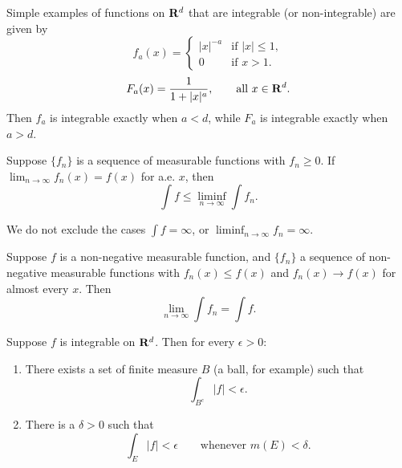 \begin{example}
    Simple examples of functions on $\mathbf{R}^d$ that are integrable
    (or non-integrable) are given by
    \begin{equation}
        f_a(x) =
        \begin{cases}
            |x|^{-a} & \text{if } |x| \le 1,\\
            0 & \text{if } x > 1.
        \end{cases}
    \end{equation}
    \begin{equation}
        F_a(x) = \frac{1}{1 + |x|^a}, \qquad \text{all } x \in \mathbf{R}^d.
    \end{equation}
    Then $f_a$ is integrable exactly when $a < d$, while $F_a$ is integrable
    exactly when $a > d$.
\end{example}

\begin{lemma}[Fatou]
    Suppose $\{f_n\}$ is a sequence of measurable functions with $f_n \geq 0$.
    If $\lim_{n \to \infty} f_n(x) = f(x)$ for a.e. $x$, then
    \begin{equation}
        \int f \le \liminf_{n \to \infty} \int f_n.
    \end{equation}
\end{lemma}

\begin{remark}
    We do not exclude the cases $\int f = \infty$,
    or $\liminf_{n \to \infty} f_n = \infty$.
\end{remark}

\begin{corollary}
    Suppose $f$ is a non-negative measurable function, and $\{f_n\}$ a sequence
    of non-negative measurable functions with
    $f_n(x) \le f(x)$ and $f_n(x) \to f(x)$ for almost every $x$. Then
    \begin{equation}
        \lim_{n \to \infty} \int f_n = \int f.
    \end{equation}
\end{corollary}

\begin{proposition}
    Suppose $f$ is integrable on $\mathbf{R}^d$. Then for every $\epsilon > 0$:
    \begin{enumerate}
        \renewcommand{\theenumi}{\roman{enumi}}
        \item There exists a set of finite measure $B$ (a ball, for example) such that
        \begin{equation}
            \int_{B^c} |f| < \epsilon.
        \end{equation}
        \item There is a $\delta > 0$ such that
        \begin{equation}
            \int_E |f| < \epsilon \qquad \text{whenever } m(E) < \delta.
        \end{equation}
    \end{enumerate}
\end{proposition}

